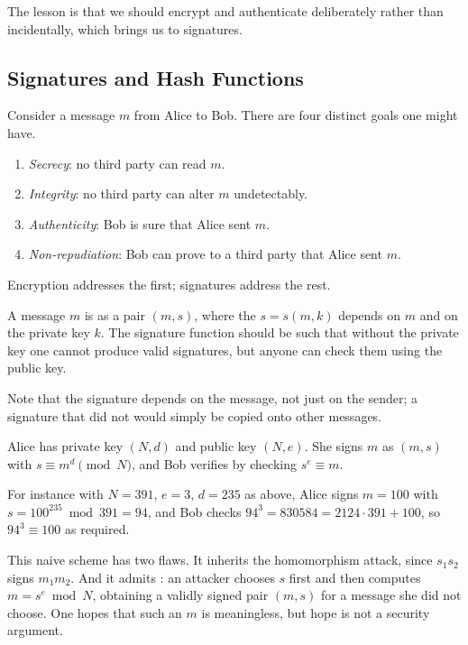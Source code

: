 The lesson is that we should encrypt and authenticate deliberately rather than incidentally, which brings us to signatures.

\subsection{Signatures and Hash Functions}

Consider a message $m$ from Alice to Bob. There are four distinct goals one might have.
\begin{enumerate}[label=(\roman*)]
	\item \emph{Secrecy}: no third party can read $m$.
	\item \emph{Integrity}: no third party can alter $m$ undetectably.
	\item \emph{Authenticity}: Bob is sure that Alice sent $m$.
	\item \emph{Non-repudiation}: Bob can prove to a third party that Alice sent $m$.
\end{enumerate}
Encryption addresses the first; signatures address the rest.

\begin{definition}[Signature]
	A message $m$ is  as a pair $(m,s)$, where the  $s = s(m,k)$ depends on $m$ and on the private key $k$. The signature function should be such that without the private key one cannot produce valid signatures, but anyone can check them using the public key.
\end{definition}

Note that the signature depends on the message, not just on the sender; a signature that did not would simply be copied onto other messages.

\begin{example}
	Alice has private key $(N,d)$ and public key $(N,e)$. She signs $m$ as $(m,s)$ with $s \equiv m^d\pmod N$, and Bob verifies by checking $s^e\equiv m$.

	For instance with $N = 391$, $e = 3$, $d = 235$ as above, Alice signs $m = 100$ with $s = 100^{235}\bmod391 = 94$, and Bob checks $94^3 = 830584 = 2124\cdot391+100$, so $94^3\equiv100$ as required.

	This naive scheme has two flaws. It inherits the homomorphism attack, since $s_1s_2$ signs $m_1m_2$. And it admits : an attacker chooses $s$ first and then computes $m = s^e\bmod N$, obtaining a validly signed pair $(m,s)$ for a message she did not choose. One hopes that such an $m$ is meaningless, but hope is not a security argument.
\end{example}

